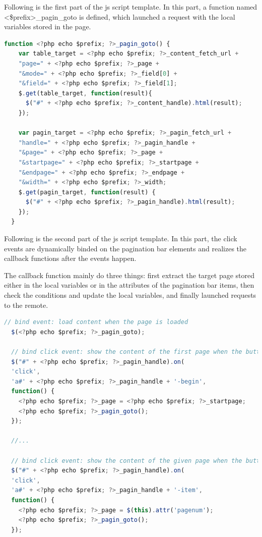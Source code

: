 \documentclass[a4paper, 10pt]{article}
\begin{document}
Following is the first part of the js script template. In this part, a function named <\$prefix>\_pagin\_goto is defined, which launched a request with the local variables stored in the page.
\begin{lstlisting}[language=Javascript]
  function <?php echo $prefix; ?>_pagin_goto() {
    var table_target = <?php echo $prefix; ?>_content_fetch_url + 
    "page=" + <?php echo $prefix; ?>_page +
    "&mode=" + <?php echo $prefix; ?>_field[0] + 
    "&field=" + <?php echo $prefix; ?>_field[1];
    $.get(table_target, function(result){
      $("#" + <?php echo $prefix; ?>_content_handle).html(result);
    });

    var pagin_target = <?php echo $prefix; ?>_pagin_fetch_url + 
    "handle=" + <?php echo $prefix; ?>_pagin_handle +
    "&page=" + <?php echo $prefix; ?>_page +
    "&startpage=" + <?php echo $prefix; ?>_startpage +
    "&endpage=" + <?php echo $prefix; ?>_endpage +
    "&width=" + <?php echo $prefix; ?>_width;
    $.get(pagin_target, function(result) {
      $("#" + <?php echo $prefix; ?>_pagin_handle).html(result);
    });
  }
\end{lstlisting}

Following is the second part of the js script template. In this part, the click events are dynamically binded on the pagination bar elements and realizes the callback functions after the events happen.

The callback function mainly do three things: first extract the target page stored either in the local variables or in the attributes of the pagination bar items, then check the conditions and update the local variables, and finally launched requests to the remote.

\begin{lstlisting}[language=Javascript]
  // bind event: load content when the page is loaded
  $(<?php echo $prefix; ?>_pagin_goto);

  // bind click event: show the content of the first page when the button is pushed down
  $("#" + <?php echo $prefix; ?>_pagin_handle).on(
  'click',
  'a#' + <?php echo $prefix; ?>_pagin_handle + '-begin',
  function() {
    <?php echo $prefix; ?>_page = <?php echo $prefix; ?>_startpage;
    <?php echo $prefix; ?>_pagin_goto();
  });

  //...

  // bind click event: show the content of the given page when the button is pushed down
  $("#" + <?php echo $prefix; ?>_pagin_handle).on(
  'click',
  'a#' + <?php echo $prefix; ?>_pagin_handle + '-item', 
  function() {
    <?php echo $prefix; ?>_page = $(this).attr('pagenum');
    <?php echo $prefix; ?>_pagin_goto();
  });
\end{lstlisting}
\end{document}
